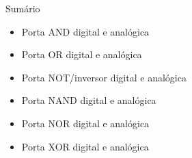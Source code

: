 
\begin{frame}{Sumário}
    \begin{itemize}
        \item Porta AND digital e analógica
        \item Porta OR digital e analógica
        \item Porta NOT/inversor digital e analógica
        \item Porta NAND digital e analógica
        \item Porta NOR digital e analógica
        \item Porta XOR digital e analógica
    \end{itemize}
\end{frame}